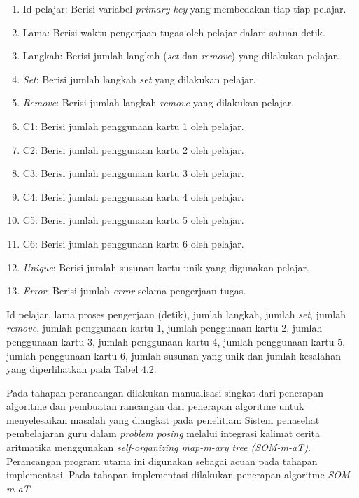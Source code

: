 \begin{enumerate}
        \begin{enumerate}
            \renewcommand{\labelenumii}{\arabic{enumii}.}
            \item Id pelajar: Berisi variabel \textit{primary key} yang membedakan tiap-tiap pelajar.
            \item Lama: Berisi waktu pengerjaan tugas oleh pelajar dalam satuan detik.
            \item Langkah: Berisi jumlah langkah (\textit{set} dan \textit{remove}) yang dilakukan pelajar.
            \item \textit{Set}: Berisi jumlah langkah \textit{set} yang dilakukan pelajar.
            \item \textit{Remove}: Berisi jumlah langkah \textit{remove} yang dilakukan pelajar.
            \item C1: Berisi jumlah penggunaan kartu 1 oleh pelajar.
            \item C2: Berisi jumlah penggunaan kartu 2 oleh pelajar.
            \item C3: Berisi jumlah penggunaan kartu 3 oleh pelajar.
            \item C4: Berisi jumlah penggunaan kartu 4 oleh pelajar.
            \item C5: Berisi jumlah penggunaan kartu 5 oleh pelajar.
            \item C6: Berisi jumlah penggunaan kartu 6 oleh pelajar.
            \item \textit{Unique}: Berisi jumlah susunan kartu unik yang digunakan pelajar.
            \item \textit{Error}: Berisi jumlah \textit{error} selama pengerjaan tugas.
        \end{enumerate}

        Id pelajar, lama proses pengerjaan (detik), jumlah langkah, jumlah \textit{set}, jumlah \textit{remove}, jumlah penggunaan kartu 1, jumlah penggunaan kartu 2, jumlah penggunaan kartu 3, jumlah penggunaan kartu 4, jumlah penggunaan kartu 5, jumlah penggunaan kartu 6, jumlah susunan yang unik dan jumlah kesalahan yang diperlihatkan pada Tabel 4.2.

        Pada tahapan perancangan dilakukan manualisasi singkat dari penerapan algoritme dan pembuatan rancangan dari penerapan algoritme untuk menyelesaikan masalah yang diangkat pada penelitian: Sistem penasehat pembelajaran guru dalam \textit{problem posing} melalui integrasi kalimat cerita aritmatika menggunakan \textit{self-organizing map-m-ary tree (SOM-m-aT)}. Perancangan program utama ini digunakan sebagai acuan pada tahapan implementasi. Pada tahapan implementasi dilakukan penerapan algoritme \textit{SOM-m-aT}. 


\end{enumerate}
